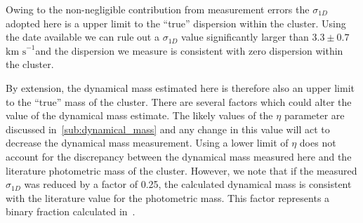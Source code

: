 \documentclass[useAMS,usenatbib]{mn2e}
\def\kms{$\mbox{km s}^{-1}$}
\begin{document}
Owing to the non-negligible contribution from measurement errors the $\sigma_{1D}$ adopted here is a upper limit to the ``true'' dispersion within the cluster.
Using the date available we can rule out a $\sigma_{1D}$ value significantly larger than $3.3\pm0.7\,$\kms and the dispersion we measure is consistent with zero dispersion within the cluster.

By extension, the dynamical mass estimated here is therefore also an upper limit to the ``true'' mass of the cluster.
There are several factors which could alter the value of the dynamical mass estimate.
The likely values of the $\eta$ parameter are discussed in~\ref{sub:dynamical_mass} and any change in this value will act to decrease the dynamical mass measurement.
Using a lower limit of $\eta$ does not account for the discrepancy between the dynamical mass measured here and the literature photometric mass of the cluster.
However, we note that if the measured $\sigma_{1D}$ was reduced by a factor of 0.25, the calculated dynamical mass is consistent with the literature value for the photometric mass.
This factor represents a binary fraction calculated in~\citet{2010MNRAS.402.1750G}.






\end{document}
